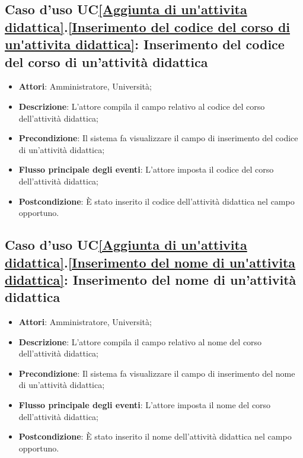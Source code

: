 \subsection{Caso d'uso UC\ref{Aggiunta di un'attivita didattica}.\ref{Inserimento del codice del corso di un'attivita didattica}: Inserimento del codice del corso di un'attività didattica}
\begin{itemize}
	\item \textbf{Attori}: Amministratore, Università;
	\item \textbf{Descrizione}: L'attore compila il campo relativo al codice del corso dell'attività didattica;
	
	\item \textbf{Precondizione}: Il sistema fa visualizzare il campo di inserimento del codice di un'attività didattica;
	
	\item \textbf{Flusso principale degli eventi}: L'attore imposta il codice del corso dell'attività didattica;
	
	\item \textbf{Postcondizione}: È stato inserito il codice dell'attività didattica nel campo opportuno.
	
\end{itemize}

\subsection{Caso d'uso UC\ref{Aggiunta di un'attivita didattica}.\ref{Inserimento del nome di un'attivita didattica}: Inserimento del nome di un'attività didattica}
\begin{itemize}
	\item \textbf{Attori}: Amministratore, Università;
	\item \textbf{Descrizione}: L'attore compila il campo relativo al nome del corso dell'attività didattica;
	
	\item \textbf{Precondizione}: Il sistema fa visualizzare il campo di inserimento del nome di un'attività didattica;
	
	\item \textbf{Flusso principale degli eventi}: L'attore imposta il nome del corso dell'attività didattica;
	
	\item \textbf{Postcondizione}: È stato inserito il nome dell'attività didattica nel campo opportuno.
\end{itemize}

